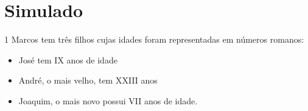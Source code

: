 

%




\chapter[Simulado 2]{Simulado}

\num{1}  Marcos tem três filhos cujas idades foram representadas em números
romanos:

\begin{itemize}
\item
  José tem IX anos de idade
\item
  André, o mais velho, tem XXIII anos
\item
  Joaquim, o mais novo possui VII anos de idade.
\end{itemize}

